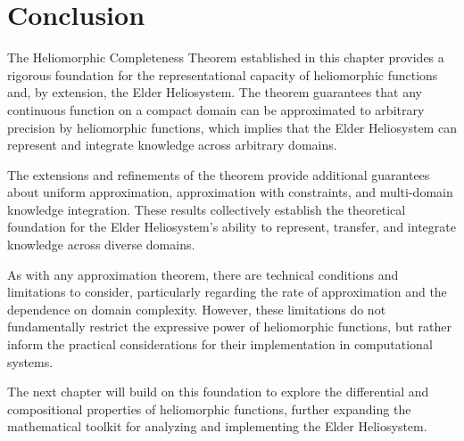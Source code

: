 \section{Conclusion}

The Heliomorphic Completeness Theorem established in this chapter provides a rigorous foundation for the representational capacity of heliomorphic functions and, by extension, the Elder Heliosystem. The theorem guarantees that any continuous function on a compact domain can be approximated to arbitrary precision by heliomorphic functions, which implies that the Elder Heliosystem can represent and integrate knowledge across arbitrary domains.

The extensions and refinements of the theorem provide additional guarantees about uniform approximation, approximation with constraints, and multi-domain knowledge integration. These results collectively establish the theoretical foundation for the Elder Heliosystem's ability to represent, transfer, and integrate knowledge across diverse domains.

As with any approximation theorem, there are technical conditions and limitations to consider, particularly regarding the rate of approximation and the dependence on domain complexity. However, these limitations do not fundamentally restrict the expressive power of heliomorphic functions, but rather inform the practical considerations for their implementation in computational systems.

The next chapter will build on this foundation to explore the differential and compositional properties of heliomorphic functions, further expanding the mathematical toolkit for analyzing and implementing the Elder Heliosystem.